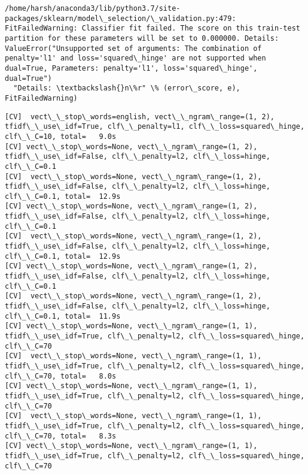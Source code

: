 \documentclass[11pt]{article}
\begin{document}
    \begin{Verbatim}[commandchars=\\\{\}]
/home/harsh/anaconda3/lib/python3.7/site-packages/sklearn/model\_selection/\_validation.py:479: FitFailedWarning: Classifier fit failed. The score on this train-test partition for these parameters will be set to 0.000000. Details: 
ValueError("Unsupported set of arguments: The combination of penalty='l1' and loss='squared\_hinge' are not supported when dual=True, Parameters: penalty='l1', loss='squared\_hinge', dual=True")
  "Details: \textbackslash{}n\%r" \% (error\_score, e), FitFailedWarning)

    \end{Verbatim}

    \begin{Verbatim}[commandchars=\\\{\}]
[CV]  vect\_\_stop\_words=english, vect\_\_ngram\_range=(1, 2), tfidf\_\_use\_idf=True, clf\_\_penalty=l1, clf\_\_loss=squared\_hinge, clf\_\_C=10, total=   9.0s
[CV] vect\_\_stop\_words=None, vect\_\_ngram\_range=(1, 2), tfidf\_\_use\_idf=False, clf\_\_penalty=l2, clf\_\_loss=hinge, clf\_\_C=0.1 
[CV]  vect\_\_stop\_words=None, vect\_\_ngram\_range=(1, 2), tfidf\_\_use\_idf=False, clf\_\_penalty=l2, clf\_\_loss=hinge, clf\_\_C=0.1, total=  12.9s
[CV] vect\_\_stop\_words=None, vect\_\_ngram\_range=(1, 2), tfidf\_\_use\_idf=False, clf\_\_penalty=l2, clf\_\_loss=hinge, clf\_\_C=0.1 
[CV]  vect\_\_stop\_words=None, vect\_\_ngram\_range=(1, 2), tfidf\_\_use\_idf=False, clf\_\_penalty=l2, clf\_\_loss=hinge, clf\_\_C=0.1, total=  12.9s
[CV] vect\_\_stop\_words=None, vect\_\_ngram\_range=(1, 2), tfidf\_\_use\_idf=False, clf\_\_penalty=l2, clf\_\_loss=hinge, clf\_\_C=0.1 
[CV]  vect\_\_stop\_words=None, vect\_\_ngram\_range=(1, 2), tfidf\_\_use\_idf=False, clf\_\_penalty=l2, clf\_\_loss=hinge, clf\_\_C=0.1, total=  11.9s
[CV] vect\_\_stop\_words=None, vect\_\_ngram\_range=(1, 1), tfidf\_\_use\_idf=True, clf\_\_penalty=l2, clf\_\_loss=squared\_hinge, clf\_\_C=70 
[CV]  vect\_\_stop\_words=None, vect\_\_ngram\_range=(1, 1), tfidf\_\_use\_idf=True, clf\_\_penalty=l2, clf\_\_loss=squared\_hinge, clf\_\_C=70, total=   8.0s
[CV] vect\_\_stop\_words=None, vect\_\_ngram\_range=(1, 1), tfidf\_\_use\_idf=True, clf\_\_penalty=l2, clf\_\_loss=squared\_hinge, clf\_\_C=70 
[CV]  vect\_\_stop\_words=None, vect\_\_ngram\_range=(1, 1), tfidf\_\_use\_idf=True, clf\_\_penalty=l2, clf\_\_loss=squared\_hinge, clf\_\_C=70, total=   8.3s
[CV] vect\_\_stop\_words=None, vect\_\_ngram\_range=(1, 1), tfidf\_\_use\_idf=True, clf\_\_penalty=l2, clf\_\_loss=squared\_hinge, clf\_\_C=70 

\end{Verbatim}
\end{document}
